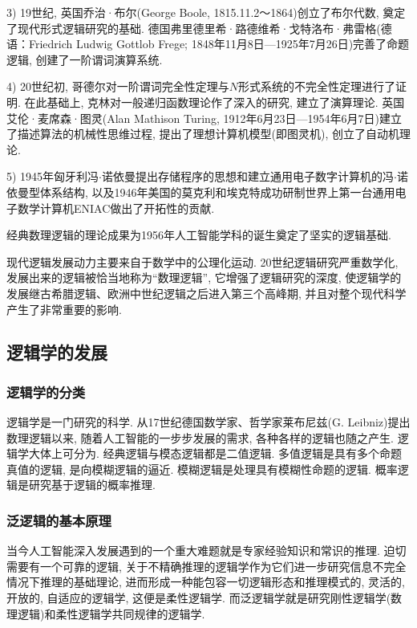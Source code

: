 3) 19世纪, 英国乔治·布尔(George Boole, 1815.11.2～1864)创立了布尔代数, 奠定了现代形式逻辑研究的基础. 德国弗里德里希·路德维希·戈特洛布·弗雷格(德语：Friedrich Ludwig Gottlob Frege; 1848年11月8日—1925年7月26日)完善了命题逻辑, 创建了一阶谓词演算系统.

4) 20世纪初, 哥德尔对一阶谓词完全性定理与$N$形式系统的不完全性定理进行了证明. 在此基础上, 克林对一般递归函数理论作了深入的研究, 建立了演算理论. 英国艾伦·麦席森·图灵(Alan Mathison Turing, 1912年6月23日—1954年6月7日)建立了描述算法的机械性思维过程, 提出了理想计算机模型(即图灵机), 创立了自动机理论.

5) 1945年匈牙利冯$\cdot$诺依曼提出存储程序的思想和建立通用电子数字计算机的冯$\cdot$诺依曼型体系结构, 以及1946年美国的莫克利和埃克特成功研制世界上第一台通用电子数学计算机ENIAC做出了开拓性的贡献.
\begin{remark}
经典数理逻辑的理论成果为1956年人工智能学科的诞生奠定了坚实的逻辑基础.

现代逻辑发展动力主要来自于数学中的公理化运动. 20世纪逻辑研究严重数学化, 发展出来的逻辑被恰当地称为“数理逻辑”, 它增强了逻辑研究的深度, 使逻辑学的发展继古希腊逻辑、欧洲中世纪逻辑之后进入第三个高峰期, 并且对整个现代科学产生了非常重要的影响.
\end{remark}

\subsection{逻辑学的发展}
\subsubsection{逻辑学的分类}

逻辑学是一门研究的科学.  从17世纪德国数学家、哲学家莱布尼兹(G. Leibniz)提出数理逻辑以来, 随着人工智能的一步步发展的需求, 各种各样的逻辑也随之产生. 逻辑学大体上可分为. 经典逻辑与模态逻辑都是二值逻辑. 多值逻辑是具有多个命题真值的逻辑, 是向模糊逻辑的逼近. 模糊逻辑是处理具有模糊性命题的逻辑. 概率逻辑是研究基于逻辑的概率推理.
\subsubsection{泛逻辑的基本原理}

当今人工智能深入发展遇到的一个重大难题就是专家经验知识和常识的推理. 迫切需要有一个可靠的逻辑, 关于不精确推理的逻辑学作为它们进一步研究信息不完全情况下推理的基础理论, 进而形成一种能包容一切逻辑形态和推理模式的, 灵活的, 开放的, 自适应的逻辑学, 这便是柔性逻辑学. 而泛逻辑学就是研究刚性逻辑学(数理逻辑)和柔性逻辑学共同规律的逻辑学.

